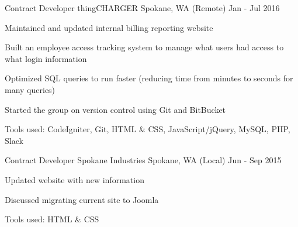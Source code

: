 \begin{cventries}
  \cventry
    {Contract Developer} %
    {thingCHARGER} %
    {Spokane, WA (Remote)} %
    {Jan - Jul 2016} %
    {
      \begin{cvitems} %
        \item {Maintained and updated internal billing reporting website}
        \item {Built an employee access tracking system to manage what users had access to what login information}
        \item {Optimized SQL queries to run faster (reducing time from minutes to seconds for many queries)}
        \item {Started the group on version control using Git and BitBucket}
        \item {Tools used: CodeIgniter, Git, HTML \& CSS, JavaScript/jQuery, MySQL, PHP, Slack}
      \end{cvitems}
    }

  \cventry
    {Contract Developer} %
    {Spokane Industries} %
    {Spokane, WA (Local)} %
    {Jun - Sep 2015} %
    {
      \begin{cvitems} %
        \item {Updated website with new information}
        \item {Discussed migrating current site to Joomla}
        \item {Tools used: HTML \& CSS}
      \end{cvitems}
    }


\end{cventries}
